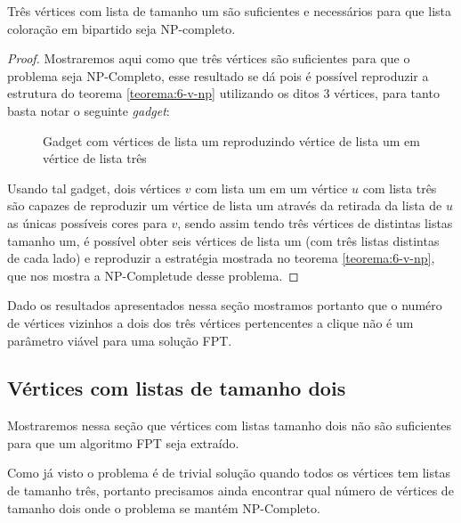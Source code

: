 \begin{teorema}
  Três vértices com lista de tamanho um são suficientes e necessários para que lista coloração em bipartido seja NP-completo.
\end{teorema}
\begin{proof}
  Mostraremos aqui como que três vértices são suficientes para que o problema seja NP-Completo, esse resultado se dá pois é possível reproduzir a estrutura do teorema \ref{teorema:6-v-np} utilizando os ditos 3 vértices, para tanto basta notar o seguinte \emph{gadget}:
  
\begin{figure}[H]
  \begin{subfigure}
    \centering
		
  \end{subfigure}
  \begin{subfigure}
    \centering
		
  \end{subfigure}
  \begin{subfigure}
    \centering
		
  \end{subfigure}
  \caption{Gadget com vértices de lista um reproduzindo vértice de lista um em vértice de lista três}
\end{figure}

Usando tal gadget, dois vértices $v$ com lista um em um vértice $u$ com lista três são capazes de reproduzir um vértice de lista um através da retirada da lista de $u$ as únicas possíveis cores para $v$, sendo assim tendo três vértices de distintas listas tamanho um, é possível obter seis vértices de lista um (com três listas distintas de cada lado) e reproduzir a estratégia mostrada no teorema \ref{teorema:6-v-np}, que nos mostra a NP-Completude desse problema.
  
\end{proof}
 Dado os resultados apresentados nessa seção mostramos portanto que o numéro de vértices vizinhos a dois dos três vértices pertencentes a clique não é um parâmetro viável para uma solução FPT.
  
\subsection{Vértices com listas de tamanho dois}
Mostraremos nessa seção que vértices com listas tamanho dois não são suficientes para que um algoritmo FPT seja extraído.

Como já visto o problema é de trivial solução quando todos os vértices tem listas de tamanho três, portanto precisamos ainda encontrar qual número de vértices de tamanho dois onde o problema se mantém NP-Completo.

